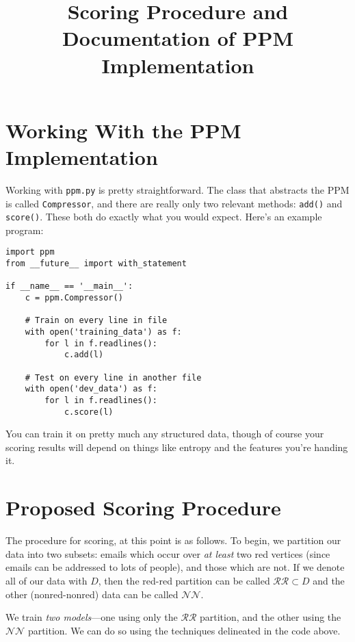 \documentclass[11pt]{article}
\title{Scoring Procedure and Documentation of PPM Implementation}
\author{}
\begin{document}
\lstset{language=C++,basicstyle=\small,
        stringstyle=\ttfamily,showstringspaces=false}

\singlespace
\maketitle

\section{Working With the PPM Implementation}\label{ch:overview}
Working with \texttt{ppm.py} is pretty straightforward. The class that abstracts the PPM is called \texttt{Compressor}, and there are really only two relevant methods: \texttt{add()} and \texttt{score()}. These both do exactly what you would expect. Here's an example program:

\begin{verbatim}
import ppm
from __future__ import with_statement

if __name__ == '__main__':
    c = ppm.Compressor()
	
    # Train on every line in file
    with open('training_data') as f:
        for l in f.readlines():
            c.add(l)
	
    # Test on every line in another file
    with open('dev_data') as f:
        for l in f.readlines():
            c.score(l)
\end{verbatim}

You can train it on pretty much any structured data, though of course your scoring results will depend on things like entropy and the features you're handing it.

\section{Proposed Scoring Procedure}\label{ch:overview}
The procedure for scoring, at this point is as follows. To begin, we partition our data into two subsets: emails which occur over \textit{at least} two red vertices (since emails can be addressed to lots of people), and those which are not. If we denote all of our data with $D$, then the red-red partition can be called $\mathcal{RR} \subset D$ and the other (nonred-nonred) data can be called $\mathcal{NN}$.

We train \textit{two models}---one using only the $\mathcal{RR}$ partition, and the other using the $\mathcal{NN}$ partition. We can do so using the techniques delineated in the code above.
\end{document}
